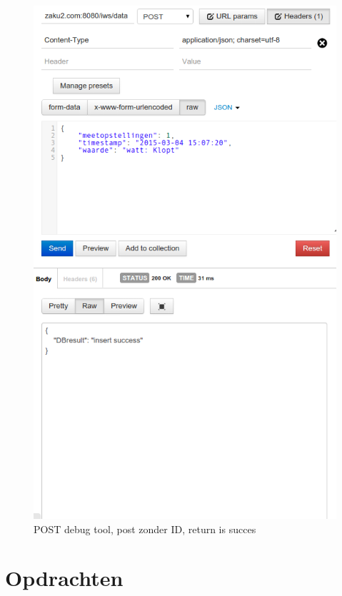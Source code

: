 \documentclass[12pt]{article}
\begin{document}
\begin{figure}
\begin{center}
\includegraphics[scale=.6]{Rest_test_3.png}
\caption{POST debug tool, post zonder ID, return is succes}
\label{fig:rest_test3}
\end{center}
\end{figure}
\clearpage


\section{Opdrachten}
\end{document}
